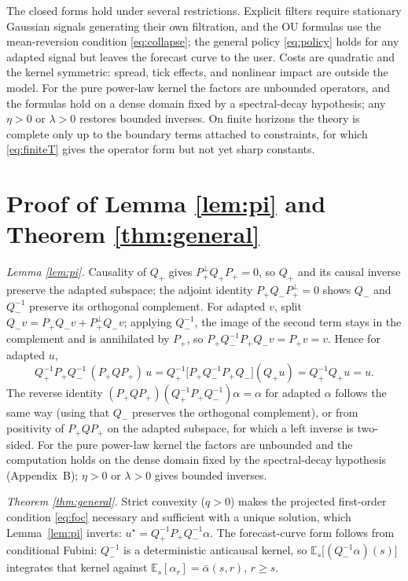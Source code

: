 \documentclass[11pt]{article}
\newcommand{\E}{\mathbb{E}}
\theoremstyle{plain}
\begin{document}
The closed forms hold under several restrictions. Explicit filters require stationary Gaussian signals generating their own filtration, and the OU formulas use the mean-reversion condition \eqref{eq:collapse}; the general policy \eqref{eq:policy} holds for any adapted signal but leaves the forecast curve to the user. Costs are quadratic and the kernel symmetric: spread, tick effects, and nonlinear impact are outside the model. For the pure power-law kernel the factors are unbounded operators, and the formulas hold on a dense domain fixed by a spectral-decay hypothesis; any $\eta>0$ or $\lambda>0$ restores bounded inverses. On finite horizons the theory is complete only up to the boundary terms attached to constraints, for which \eqref{eq:finiteT} gives the operator form but not yet sharp constants.

\appendix

\section{Proof of Lemma \ref{lem:pi} and Theorem \ref{thm:general}}
\emph{Lemma \ref{lem:pi}.} Causality of $Q_+$ gives $P_+^\perp Q_+P_+ = 0$, so $Q_+$ and its causal inverse preserve the adapted subspace; the adjoint identity $P_+Q_-P_+^\perp = 0$ shows $Q_-$ and $Q_-^{-1}$ preserve its orthogonal complement. For adapted $v$, split $Q_-v = P_+Q_-v + P_+^\perp Q_-v$; applying $Q_-^{-1}$, the image of the second term stays in the complement and is annihilated by $P_+$, so $P_+Q_-^{-1}P_+Q_-v = P_+v = v$. Hence for adapted $u$,
\[
Q_+^{-1}P_+Q_-^{-1}\,(P_+QP_+)\,u = Q_+^{-1}\bigl[P_+Q_-^{-1}P_+Q_-\bigr](Q_+u) = Q_+^{-1}Q_+u = u .
\]
The reverse identity $(P_+QP_+)(Q_+^{-1}P_+Q_-^{-1})\alpha = \alpha$ for adapted $\alpha$ follows the same way (using that $Q_-$ preserves the orthogonal complement), or from positivity of $P_+QP_+$ on the adapted subspace, for which a left inverse is two-sided. For the pure power-law kernel the factors are unbounded and the computation holds on the dense domain fixed by the spectral-decay hypothesis (Appendix~B); $\eta>0$ or $\lambda>0$ gives bounded inverses.

\emph{Theorem \ref{thm:general}.} Strict convexity ($q>0$) makes the projected first-order condition \eqref{eq:foc} necessary and sufficient with a unique solution, which Lemma~\ref{lem:pi} inverts: $u^\star = Q_+^{-1}P_+Q_-^{-1}\alpha$. The forecast-curve form follows from conditional Fubini: $Q_-^{-1}$ is a deterministic anticausal kernel, so $\E_s\bigl[(Q_-^{-1}\alpha)(s)\bigr]$ integrates that kernel against $\E_s[\alpha_r] = \bar\alpha(s,r)$, $r\ge s$.
\end{document}
